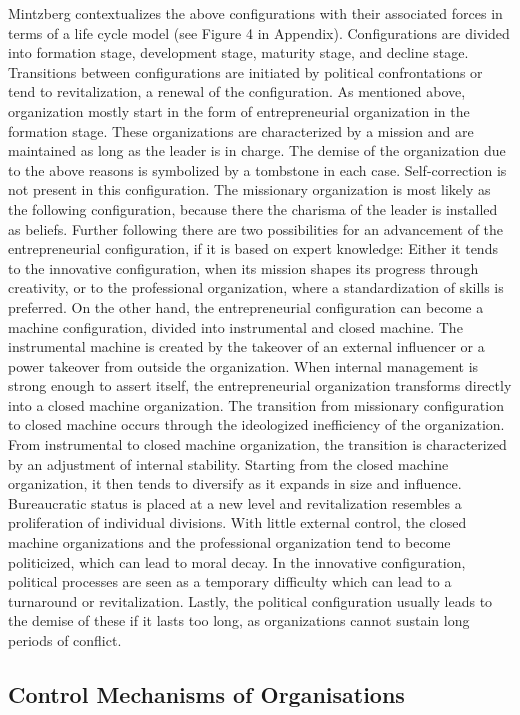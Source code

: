 \documentclass[a4paper,12pt]{article}
\begin{document}
Mintzberg contextualizes the above configurations with their associated forces
in terms of a life cycle model (see Figure 4 in Appendix). Configurations are
divided into formation stage, development stage, maturity stage, and decline
stage. Transitions between configurations are initiated by political
confrontations or tend to revitalization, a renewal of the configuration. As
mentioned above, organization mostly start in the form of entrepreneurial
organization in the formation stage. These organizations are characterized by
a mission and are maintained as long as the leader is in charge. The demise of
the organization due to the above reasons is symbolized by a tombstone in each
case. Self-correction is not present in this configuration. The missionary
organization is most likely as the following configuration, because there the
charisma of the leader is installed as beliefs. Further following there are
two possibilities for an advancement of the entrepreneurial configuration, if
it is based on expert knowledge: Either it tends to the innovative
configuration, when its mission shapes its progress through creativity, or to
the professional organization, where a standardization of skills is
preferred. On the other hand, the entrepreneurial configuration can become a
machine configuration, divided into instrumental and closed machine. The
instrumental machine is created by the takeover of an external influencer or a
power takeover from outside the organization. When internal management is
strong enough to assert itself, the entrepreneurial organization transforms
directly into a closed machine organization. The transition from missionary
configuration to closed machine occurs through the ideologized inefficiency of
the organization. From instrumental to closed machine organization, the
transition is characterized by an adjustment of internal stability. Starting
from the closed machine organization, it then tends to diversify as it expands
in size and influence. Bureaucratic status is placed at a new level and
revitalization resembles a proliferation of individual divisions. With little
external control, the closed machine organizations and the professional
organization tend to become politicized, which can lead to moral decay. In the
innovative configuration, political processes are seen as a temporary
difficulty which can lead to a turnaround or revitalization. Lastly, the
political configuration usually leads to the demise of these if it lasts too
long, as organizations cannot sustain long periods of conflict.

\subsection{Control Mechanisms of Organisations}
\end{document}
